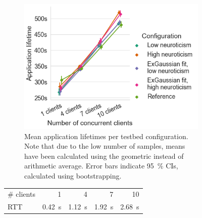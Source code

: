 \begin{figure}
    \centering
    \begin{subfigure}[]{\columnwidth}
        \centering
        \includegraphics[width=\textwidth]{figs/new_model/lifetime_testbed.png}
        \caption{%
            Mean application lifetimes per testbed configuration.
            Note that due to the low number of samples, means have been calculated using the geometric instead of arithmetic average. 
            Error bars indicate \SI{95}{\percent} \acp{CI}, calculated using bootstrapping.
        }
    \end{subfigure}
    \par\bigskip
    \begin{subtable}{\columnwidth}
        \centering
        \begin{tabular}{lrrrr}
            \toprule
            \# clients & 1 & 4 & 7 & 10 \\
            \ac{RTT} & \SI{0.42}{\second} & \SI{1.12}{\second} & \SI{1.92}{\second} & \SI{2.68}{\second} \\
            \bottomrule
        \end{tabular}
        \caption{Mean measured \aclp{RTT} for each testbed configuration.}
    \end{subtable}
    \par\bigskip
    \begin{subfigure}[]{\columnwidth}
        \centering

\end{subfigure}
\end{figure}
